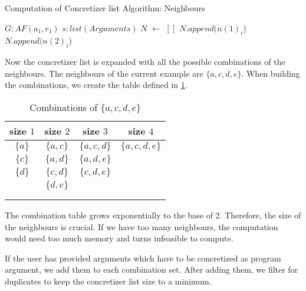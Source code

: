 \begin{algorithm}
    \caption{Computation of Concretizer list Algorithm: Neighbours}\label{alg:concretizerListNeighbours}
    \begin{algorithmic}[1]
        \Require $G: AF(a_1, r_1)$ 
        \Require $s: list(Arguments)$ 
        \State $N$ $\gets$ $[]$ 
         
             
                 
                    \State $N.append(n(1)_i$)
                    \State $N.append(n(2)_i$)
                \EndFor
            \EndFor
        \EndFor
    \end{algorithmic}
\end{algorithm}


Now the concretizer list is expanded with all the possible combinations of the neighbours. The neighbours of the current example are $\{a, c, d, e\}$. When building the combinations, we create the table defined in \cref{table:algorithmConcretizer1}.

\begin{table}[htb]
    \centering
    \begin{tabular}{ |c|c|c|c| }
     \hline
     size $1$ & size $2$ & size $3$ & size $4$\\
     \hline
     \hline
     $\{a\}$ & $\{a, c\}$ & $\{a, c, d\}$ &$\{a, c, d, e\}$ \\
     \hline
     $\{c\}$ & $\{a, d\}$ & $\{a, d, e\}$ & \\
     \hline
     $\{d\}$ & $\{c, d\}$ & $\{c, d, e\}$ & \\
     \hline
      & $\{d, e\}$ &  & \\
     \hline
       &  &  & \\
     \hline
       &  &  & \\
     \hline
    \end{tabular}
\caption{Combinations of $\{a, c, d, e\}$}
\label{table:algorithmConcretizer1}

\end{table}

The combination table grows exponentially to the base of 2. Therefore, the size of the neighbours is crucial. If we have too many neighbours, the computation would need too much memory and turns infeasible to compute.

If the user has provided arguments which have to be concretized as program argument, we add them to each combination set. After adding them, we filter for duplicates to keep the concretizer list size to a minimum.

